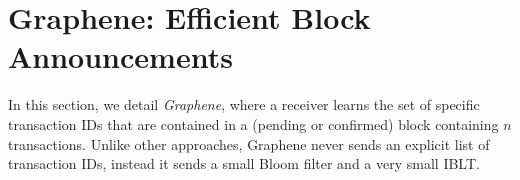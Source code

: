 
 
\section{Graphene: Efficient Block Announcements}

In this section, we detail \emph{Graphene},
where a receiver 
learns the set of specific transaction IDs that are contained in a
(pending or confirmed) block containing $n$ transactions. Unlike other approaches, Graphene never  sends an explicit list of transaction IDs, instead it sends  a small Bloom filter and a very small IBLT.  

